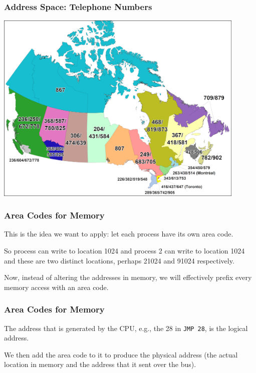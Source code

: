 \begin{frame}
\frametitle{Address Space: Telephone Numbers}

\begin{center}
	\includegraphics[width=0.9\textwidth]{images/areacodes.png}
\end{center}

\end{frame}

\begin{frame}
\frametitle{Area Codes for Memory}

This is the idea we want to apply: let each process have its own area code. 

So process can write to location 1024 and process 2 can write to location 1024 and these are two distinct locations, perhaps 21024 and 91024 respectively.

Now, instead of altering the addresses in memory, we will effectively prefix every memory access with an area code.

\end{frame}

\begin{frame}
\frametitle{Area Codes for Memory}

The address that is generated by the CPU, e.g., the 28 in \texttt{JMP 28}, is the \alert{logical address}. 

We then add the area code to it to produce the \alert{physical address} (the actual location in memory and the address that it sent over the bus). 


\end{frame}


